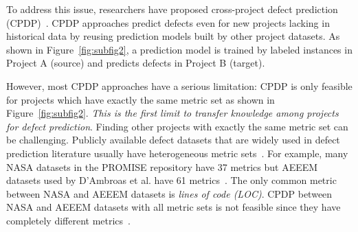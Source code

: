 To address this issue, researchers
have proposed cross-project defect
prediction (CPDP)~\cite{He12, Ma12, Nam13, Rahman12, Turhan09, Zimmermann09}.
CPDP approaches predict defects even for new projects lacking
in historical data by reusing prediction models built by other project
datasets. As shown in Figure~\ref{fig:subfig2}, a prediction model is trained by
labeled instances in Project A (source) and predicts defects in Project B (target).

% 

However, most CPDP approaches have a serious limitation:
CPDP is only feasible for projects which have exactly the same metric
set as shown in Figure~\ref{fig:subfig2}. {\em This is the first limit to transfer knowledge among projects for defect prediction}. Finding other projects with exactly
the same metric set can be challenging. Publicly available defect
datasets that are widely used in defect prediction literature usually have
heterogeneous metric sets~\cite{DAmbros12,promise12,Nam13}.
For example, many NASA datasets in the PROMISE repository have 37 metrics but
AEEEM datasets used by D'Ambroas et al. have 61
metrics~\cite{DAmbros12,promise12}.
The only common metric between NASA and AEEEM datasets is {\em lines of
code (LOC)}.
CPDP between NASA and AEEEM
datasets with all metric sets is not feasible since they have
completely different metrics~\cite{Turhan09}.


